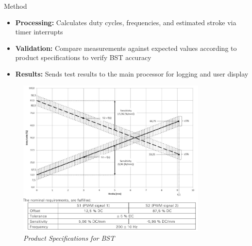 \documentclass[8pt,compress,aspectratio=169]{beamer}
\newcommand\LightBold[1]{\textcolor{VSBlueLight}{\textbf{#1}}}
\begin{document}
\begin{frame}
\begin{minipage}{0.485\textwidth}
\begin{block}{Method}
{\begin{itemize}
          \item \LightBold{Processing:} Calculates duty cycles, frequencies, and estimated stroke via timer interrupts
          \item \LightBold{Validation:} Compare measurements against expected values according to product specifications to verify BST accuracy
          \item \LightBold{Results:} Sends test results to the main processor for logging and user display
        \end{itemize}
      }
    \end{block}
  \end{minipage}
  \hfill
  \begin{minipage}{0.50\textwidth}
    \begin{figure}
      \centering
      \includegraphics[width=0.85\textwidth]{assets/specs/bst_product_specs.png}
      \caption{\it Product Specifications for BST}
    \end{figure}
  \end{minipage}
\end{frame}
\end{document}
